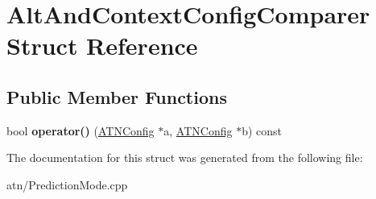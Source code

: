 \hypertarget{structAltAndContextConfigComparer}{}\section{Alt\+And\+Context\+Config\+Comparer Struct Reference}
\label{structAltAndContextConfigComparer}
\subsection*{Public Member Functions}
\begin{DoxyCompactItemize}
\item 
\mbox{\label{structAltAndContextConfigComparer_aa6634e7afe86651ba29db08b186513d4}} 
bool {\bfseries operator()} (\hyperlink{classantlr4_1_1atn_1_1ATNConfig}{A\+T\+N\+Config} $\ast$a, \hyperlink{classantlr4_1_1atn_1_1ATNConfig}{A\+T\+N\+Config} $\ast$b) const
\end{DoxyCompactItemize}


The documentation for this struct was generated from the following file\+:\begin{DoxyCompactItemize}
\item 
atn/Prediction\+Mode.\+cpp\end{DoxyCompactItemize}
